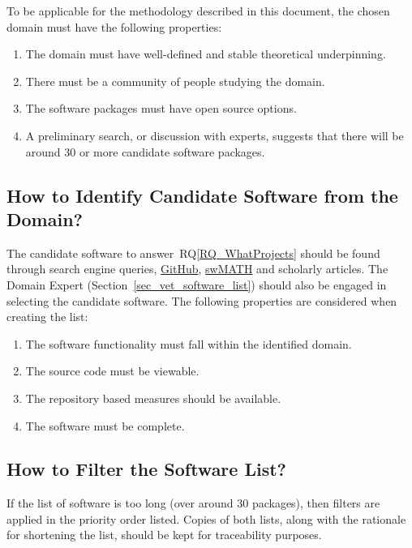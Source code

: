 \documentclass[runningheads]{llncs}
\newcommand{\rqref}[1]{RQ\ref{#1}}
\begin{document}
To be applicable for the methodology described in this document, the chosen
domain must have the following properties:

\begin{enumerate}
\item The domain must have well-defined and stable theoretical underpinning.
\item There must be a community of people studying the domain.
\item The software packages must have open source options.
\item A preliminary search, or discussion with experts, suggests that there will
  be around 30 or more candidate software packages.
\end{enumerate}	

\subsection{How to Identify Candidate Software from the Domain?}
\label{identifysoftware}

The candidate software to answer~\rqref{RQ_WhatProjects} should be found through
search engine queries,  
\href{https://github.com/} {GitHub}, \href{https://swmath.org/} {swMATH}
and scholarly articles. The Domain Expert (Section~\ref{sec_vet_software_list})
should also be engaged in selecting the candidate software.  The following
properties are considered when creating the list:

\begin{enumerate}
	\item The software functionality must fall within the identified domain.
	\item The source code must be viewable.
	\item The repository based measures should be available.
	\item The software must be complete.
\end{enumerate}

\subsection{How to Filter the Software List?} \label{filtersoftware}

If the list of software is too long (over around 30 packages), then filters are
applied in the priority order listed. Copies of both lists, along with the
rationale for shortening the list, should be kept for traceability purposes.
\end{document}

